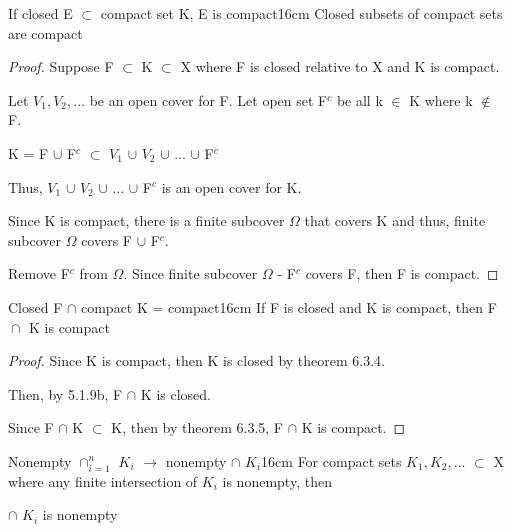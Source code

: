 	\begin{wtheorem}{If closed E $\subset$ compact set K, E is compact}{16cm}
		Closed subsets of compact sets are compact
	\end{wtheorem}
	
	\begin{proof}
		Suppose F $\subset$ K $\subset$ X where F is closed relative to X
		and K is compact.

		Let $V_1, V_2, ...$ be an open cover for F.
		Let open set F$^c$ be all k $\in$ K where k $\not \in$ F.

		\qquad K = F $\cup$ F$^c$ $\subset$ $V_1$ $\cup$ $V_2$ $\cup$ ... $\cup$ F$^c$

		Thus, $V_1$ $\cup$ $V_2$ $\cup$ ... $\cup$ F$^c$ is an open cover for K.

		Since K is compact, there is a finite subcover $\Omega$ that covers K
		and thus, finite subcover $\Omega$ covers F $\cup$ F$^c$.
		
		Remove F$^c$ from $\Omega$. Since finite subcover $\Omega$ - F$^c$ covers F,
		then F is compact.
	\end{proof}

	 \vspace{0.5cm}



	 \begin{corollary}{Closed F $\cap$ compact K = compact}{16cm}
		If F is closed and K is compact, then F $\cap_{}^{}$ K is compact 
	 \end{corollary}
	 
	 \begin{proof}
		Since K is compact, then K is closed by {\color{red} theorem 6.3.4}.

		Then, by {\color{red} 5.1.9b}, F $\cap$ K is closed.

		Since F $\cap$ K $\subset$ K, then by {\color{red} theorem 6.3.5},
		F $\cap$ K is compact. 
	 \end{proof}

	\newpage


	
	\begin{wtheorem}{Nonempty $\cap_{i=1}^n$ $K_i$ $\rightarrow$
	nonempty $\cap$ $K_i$}{16cm}
		For compact sets $K_1, K_2, ...$ $\subset$ X where any finite intersection
		of $K_i$ is nonempty, then
		
		$\cap$ $K_i$ is nonempty		
	\end{wtheorem}
	
